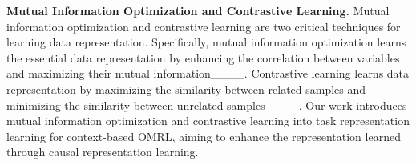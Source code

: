 \noindent\textbf{Mutual Information Optimization and Contrastive Learning.}
Mutual information optimization and contrastive learning are two critical techniques for learning data representation. Specifically, mutual information optimization learns the essential data representation by enhancing the correlation between variables and maximizing their mutual information____. Contrastive learning learns data representation by maximizing the similarity between related samples and minimizing the similarity between unrelated samples____. Our work introduces mutual information optimization and contrastive learning into task representation learning for context-based OMRL, aiming to enhance the representation learned through causal representation learning.